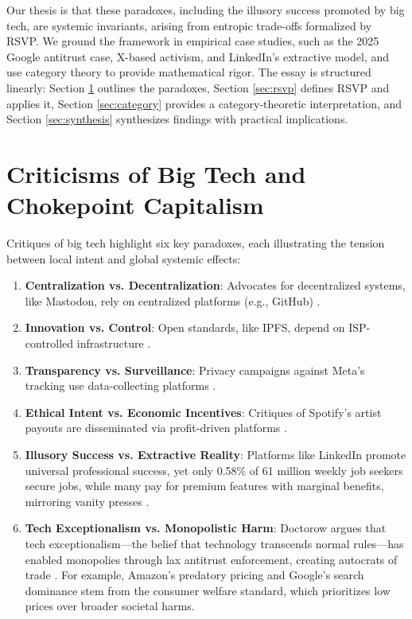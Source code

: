 \documentclass{article}
\begin{document}
Our thesis is that these paradoxes, including the illusory success promoted by big tech, are systemic invariants, arising from entropic trade-offs formalized by RSVP. We ground the framework in empirical case studies, such as the 2025 Google antitrust case, X-based activism, and LinkedIn’s extractive model, and use category theory to provide mathematical rigor. The essay is structured linearly: Section \ref{sec:criticisms} outlines the paradoxes, Section \ref{sec:rsvp} defines RSVP and applies it, Section \ref{sec:category} provides a category-theoretic interpretation, and Section \ref{sec:synthesis} synthesizes findings with practical implications.

\section{Criticisms of Big Tech and Chokepoint Capitalism}
\label{sec:criticisms}

Critiques of big tech highlight six key paradoxes, each illustrating the tension between local intent and global systemic effects:

\begin{enumerate}
    \item \textbf{Centralization vs. Decentralization}: Advocates for decentralized systems, like Mastodon, rely on centralized platforms (e.g., GitHub) \cite{mastodon2025}.
    \item \textbf{Innovation vs. Control}: Open standards, like IPFS, depend on ISP-controlled infrastructure \cite{ipfs2025}.
    \item \textbf{Transparency vs. Surveillance}: Privacy campaigns against Meta’s tracking use data-collecting platforms \cite{meta2025}.
    \item \textbf{Ethical Intent vs. Economic Incentives}: Critiques of Spotify’s artist payouts are disseminated via profit-driven platforms \cite{spotify2025}.
    \item \textbf{Illusory Success vs. Extractive Reality}: Platforms like LinkedIn promote universal professional success, yet only 0.58\% of 61 million weekly job seekers secure jobs, while many pay for premium features with marginal benefits, mirroring vanity presses \cite{kinsta2025linkedin,ghedau2025linkedin,amos2024}.
    \item \textbf{Tech Exceptionalism vs. Monopolistic Harm}: Doctorow argues that tech exceptionalism—the belief that technology transcends normal rules—has enabled monopolies through lax antitrust enforcement, creating autocrats of trade \cite{doctorow2023internetcon}. For example, Amazon’s predatory pricing and Google’s search dominance stem from the consumer welfare standard, which prioritizes low prices over broader societal harms.
\end{enumerate}
\end{document}
